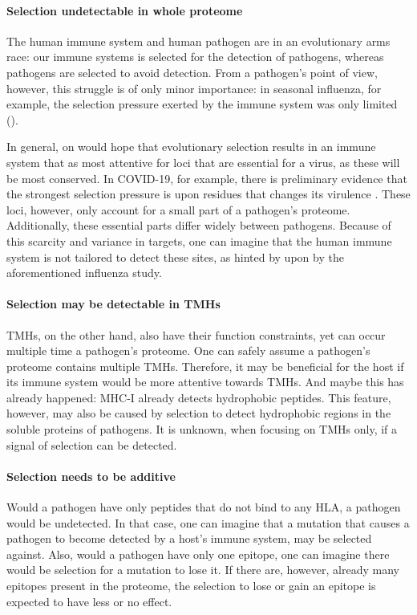 \paragraph{Selection undetectable in whole proteome}

The human immune system and human pathogen are in an evolutionary
arms race: our immune systems is selected for the detection
of pathogens, whereas pathogens are selected to avoid detection.
From a pathogen's point of view, however, this struggle 
is of only minor importance:
in seasonal influenza, for example, the selection pressure
exerted by the immune system was only limited (\cite{han2019individual}).

In general, on would hope that evolutionary selection results in
an immune system that as most attentive for loci that are
essential for a virus, as these will be most conserved.
In COVID-19, for example, there is preliminary evidence that the strongest
selection pressure is upon residues that changes its 
virulence \cite{velazquez2020positive}.
These loci, however, only account for a small part of a pathogen's proteome.
Additionally, these essential parts differ widely between pathogens.
Because of this scarcity and variance in targets, 
one can imagine that the human immune system 
is not tailored to detect these sites, 
as hinted by upon by the aforementioned influenza study.

\paragraph{Selection may be detectable in TMHs}

TMHs, on the other hand, also have their function constraints, 
yet can occur multiple time a pathogen's proteome.
One can safely assume a pathogen's proteome contains multiple TMHs.
Therefore, it may be beneficial for the host
if its immune system would be more attentive towards TMHs.
And maybe this has already happened: MHC-I already detects hydrophobic
peptides. This feature, however, may also be caused by selection
to detect hydrophobic regions in the soluble proteins of pathogens.
It is unknown, when focusing on TMHs only, if a signal of selection
can be detected.

\paragraph{Selection needs to be additive}

Would a pathogen have only peptides that do not bind to
any HLA, a pathogen would be undetected. In that case, one
can imagine that a mutation
that causes a pathogen to become detected by a host's immune
system, may be selected against. Also, would a pathogen have only
one epitope, one can imagine there would be selection for a mutation to lose it.
If there are, however, already many epitopes present in the
proteome, the selection to lose or gain an epitope is expected 
to have less or no effect.

